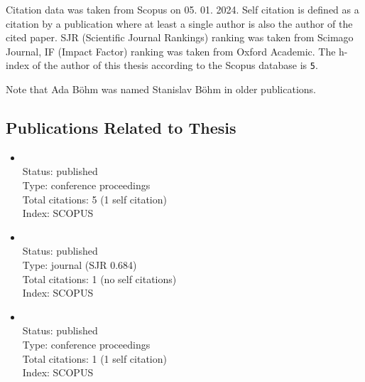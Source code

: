 Citation data was taken from Scopus on 05. 01. 2024.
Self citation is defined as a citation by a publication where at least a single author is also the
author of the cited paper. SJR (Scientific Journal Rankings) ranking was taken from Scimago Journal,
IF (Impact Factor) ranking was taken from Oxford Academic.
The h-index of the author of this thesis according to the Scopus database is \texttt{5}.

Note that Ada Böhm was named Stanislav Böhm in older publications.

\begin{refsection}
\section*{Publications Related to Thesis}
    \begin{itemize}
		\item{}\vspace{2mm}\\Status: published\\Type: conference proceedings\\Total citations: 5 (1 self citation)\\Index: SCOPUS
		\item{}\vspace{2mm}\\Status: published\\Type: journal (SJR 0.684)\\Total citations: 1 (no self citations)\\Index: SCOPUS
		\item{}\vspace{2mm}\\Status: published\\Type: conference proceedings\\Total citations: 1 (1 self citation)\\Index: SCOPUS
\end{itemize}

\newpage

\end{refsection}
